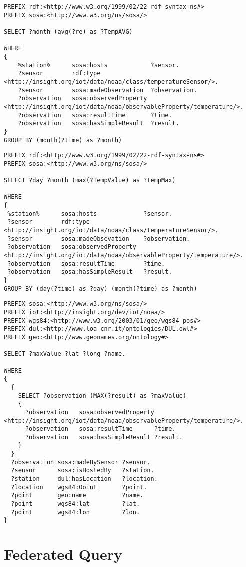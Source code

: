 {
\begin{lstlisting}[captionpos=b, 
title=Query 2. Return the average temperature in each month of a given station,
language=sparql,
basicstyle=\ttfamily,frame=single]
PREFIX rdf:<http://www.w3.org/1999/02/22-rdf-syntax-ns#>
PREFIX sosa:<http://www.w3.org/ns/sosa/>

SELECT ?month (avg(?re) as ?TempAVG)

WHERE
{
    %station%      sosa:hosts            ?sensor.
    ?sensor        rdf:type              <http://insight.org/iot/data/noaa/class/temperatureSensor/>.
    ?sensor        sosa:madeObservation  ?observation.
    ?observation   sosa:observedProperty <http://insight.org/iot/data/noaa/observableProperty/temperature/>.
    ?observation   sosa:resultTime       ?time.
    ?observation   sosa:hasSimpleResult  ?result.
}
GROUP BY (month(?time) as ?month)
\end{lstlisting}
}
{
\begin{lstlisting}[captionpos=b, 
language=sparql,
title=Query 3. Search for the date that has highest temperature in a given station
basicstyle=\ttfamily,
frame=single]
PREFIX rdf:<http://www.w3.org/1999/02/22-rdf-syntax-ns#>
PREFIX sosa:<http://www.w3.org/ns/sosa/>

SELECT ?day ?month (max(?TempValue) as ?TempMax)

WHERE
{
 %station%      sosa:hosts             ?sensor.
 ?sensor        rdf:type               <http://insight.org/iot/data/noaa/class/temperatureSensor/>.
 ?sensor        sosa:madeObsevation    ?observation.
 ?observation   sosa:observedProperty  <http://insight.org/iot/data/noaa/observableProperty/temperature/>.
 ?observation   sosa:resultTime        ?time.
 ?observation   sosa:hasSimpleResult   ?result.
}
GROUP BY (day(?time) as ?day) (month(?time) as ?month)
\end{lstlisting}
}
\newpage
\begin{lstlisting}[captionpos=b, 
title=Query 4. Search for the hottest place,
language=sparql,
basicstyle=\ttfamily,
frame=single]
PREFIX sosa:<http://www.w3.org/ns/sosa/>
PREFIX iot:<http://insight.org/dev/iot/noaa/>
PREFIX wgs84:<http://www.w3.org/2003/01/geo/wgs84_pos#>
PREFIX dul:<http://www.loa-cnr.it/ontologies/DUL.owl#>
PREFIX geo:<http://www.geonames.org/ontology#>

SELECT ?maxValue ?lat ?long ?name.

WHERE
{
  {
 	SELECT ?observation (MAX(?result) as ?maxValue)
    {
      ?observation   sosa:observedProperty  <http://insight.org/iot/data/noaa/observableProperty/temperature/>.
      ?observation   sosa:resultTime      ?time.
      ?observation   sosa:hasSimpleResult ?result.
    }
  }
  ?observation sosa:madeBySensor ?sensor.
  ?sensor      sosa:isHostedBy   ?station.
  ?station     dul:hasLocation   ?location.
  ?location    wgs84:Ooint       ?point.
  ?point       geo:name          ?name.
  ?point       wgs84:lat         ?lat.
  ?point       wgs84:lon         ?lon.
}
\end{lstlisting}
\section{Federated Query}